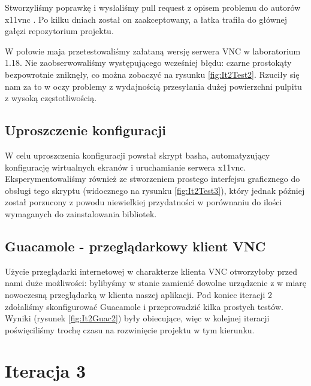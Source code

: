     Stworzyliśmy poprawkę \cite{x11vncPatch} i wysłaliśmy pull request z opisem problemu do autorów x11vnc \cite{x11vncPullRequest}. Po kilku dniach został on zaakceptowany, a łatka trafiła do głównej gałęzi repozytorium projektu.

    \vfill
    \pagebreak
    W połowie maja przetestowaliśmy załataną wersję serwera VNC w laboratorium 1.18. Nie zaobserwowaliśmy występującego wcześniej błędu: czarne prostokąty bezpowrotnie zniknęły, co można zobaczyć na rysunku \ref{fig:It2Test2}. Rzuciły się nam za to w oczy problemy z wydajnością przesyłania dużej powierzchni pulpitu z wysoką częstotliwością.

  \subsection{Uproszczenie konfiguracji}

    W celu uproszczenia konfiguracji powstał skrypt basha, automatyzujący konfigurację wirtualnych ekranów i uruchamianie serwera x11vnc. Eksperymentowaliśmy również ze stworzeniem prostego interfejsu graficznego do obsługi tego skryptu (widocznego na rysunku \ref{fig:It2Test3}), który jednak później został porzucony z powodu niewielkiej przydatności w porównaniu do ilości wymaganych do zainstalowania bibliotek.


  \subsection{Guacamole - przeglądarkowy klient VNC}

    Użycie przeglądarki internetowej w charakterze klienta VNC otworzyłoby przed nami duże możliwości: bylibyśmy w stanie zamienić dowolne urządzenie z w miarę nowoczesną przeglądarką w klienta naszej aplikacji. Pod koniec iteracji 2 zdołaliśmy skonfigurować Guacamole \cite{Guacamole} i przeprowadzić kilka prostych testów. Wyniki (rysunek \ref{fig:It2Guac2}) były obiecujące, więc w kolejnej iteracji poświęciliśmy trochę czasu na rozwinięcie projektu w tym kierunku.


    \vfill

\section{Iteracja 3}

